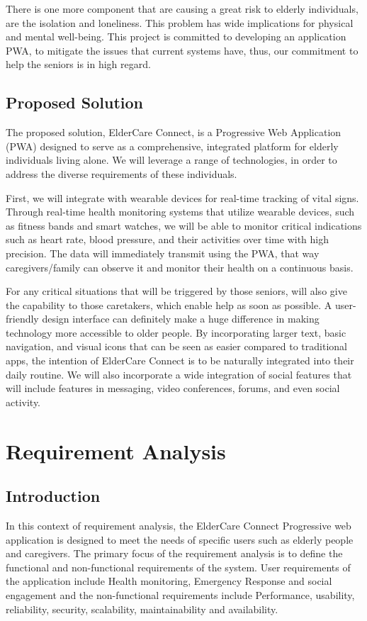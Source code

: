 \documentclass[a4paper, 12pt]{article}
\begin{document}
There is one more component that are causing a great risk to elderly individuals, are the isolation and loneliness. This problem has wide implications for physical and mental well-being.
This project is committed to developing an application PWA, to mitigate the issues that current systems have, thus, our commitment to help the seniors is in high regard.

\subsection{ Proposed Solution}
The proposed solution, ElderCare Connect, is a Progressive Web Application (PWA) designed to serve as a comprehensive, integrated platform for elderly individuals living alone. We will leverage a range of technologies, in order to address the diverse requirements of these individuals.

First, we will integrate with wearable devices for real-time tracking of vital signs. Through real-time health monitoring systems that utilize wearable devices, such as fitness bands and smart watches, we will be able to monitor critical indications such as heart rate, blood pressure, and their activities over time with high precision. The data will immediately transmit using the PWA, that way caregivers/family can observe it and monitor their health on a continuous basis.

For any critical situations that will be triggered by those seniors, will also give the capability to those caretakers, which enable help as soon as possible. A user-friendly design interface can definitely make a huge difference in making technology more accessible to older people. By incorporating larger text, basic navigation, and visual icons that can be seen as easier compared to traditional apps, the intention of ElderCare Connect is to be naturally integrated into their daily routine. We will also incorporate a wide integration of social features that will include features in messaging, video conferences, forums, and even social activity.

\newpage

\section{\textbf{Requirement Analysis}}
\subsection{Introduction}
In this context of requirement analysis, the ElderCare Connect Progressive web application is designed to meet the needs of specific users such as elderly people and caregivers. The primary focus of the requirement analysis is to define the functional and non-functional requirements of the system. User requirements of the application include Health monitoring, Emergency Response and social engagement and  the non-functional requirements include Performance, usability, reliability, security, scalability, maintainability and availability.
\end{document}
